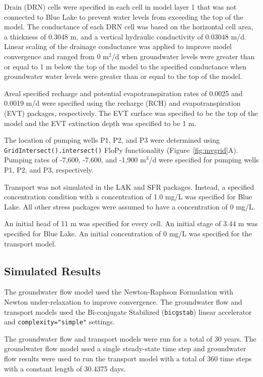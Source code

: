 \documentclass[12pt, oneside]{article}  	%
\begin{document}
Drain (DRN) cells were specified in each cell in model layer 1 that was not connected to Blue Lake to prevent water levels from exceeding the top of the model. The conductance of each DRN cell was based on the horizontal cell area, a thickness of 0.3048 m, and a vertical hydraulic conductivity of 0.03048 m/d. Linear scaling of the drainage conductance was applied to improve model convergence and ranged from 0 m$^2$/d when groundwater levels were greater than or equal to 1 m below the top of the model to the specified conductance when groundwater water levels were greater than or equal to the top of the model.

Areal specified recharge and potential evapotranspiration rates of 0.0025 and 0.0019 m/d were specified using the recharge (RCH) and evapotranspiration (EVT) packages, respectively. The EVT surface was specified to be the top of the model and the EVT extinction depth was specified to be 1 m.

The location of pumping wells P1, P2, and P3 were determined using \texttt{GridIntersect().intersect()} FloPy functionality (Figure~\ref{fig:mvgrid}A). Pumping rates of -7,600, -7,600, and -1,900 m$^3$/d were specified for pumping wells P1, P2, and P3, respectively.

Transport was not simulated in the LAK and SFR packages. Instead, a specified concentration condition with a concentration of 1.0 mg/L was specified for Blue Lake. All other stress packages were assumed to have a concentration of 0 mg/L.

An initial head of 11 m was specified for every cell. An initial stage of 3.44 m was specified for Blue Lake. An initial concentration of 0 mg/L was specified for the transport model.

\subsection*{Simulated Results}
The groundwater flow model used the Newton-Raphson Formulation with Newton under-relaxation to improve convergence. The groundwater flow and transport models used the Bi-conjugate Stabilized (\texttt{bicgstab}) linear accelerator and \texttt{complexity="simple"} settings.
 
The groundwater flow and transport models were run for a total of 30 years. The groundwater flow model used a single steady-state time step and groundwater flow results were used to run the transport model with a total of 360 time steps with a constant length of 30.4375 days.
 
\end{document}
